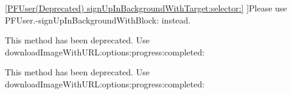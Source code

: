 \begin{DoxyRefList}
\hyperlink{category_p_f_user_07_deprecated_08_a02d96a7bd6d61e0a79fb020cacb9189f}{\mbox{[}P\+F\+User(Deprecated) sign\+Up\+In\+Background\+With\+Target\+:selector\+:\mbox{]}} ]Please use {\ttfamily P\+F\+User.-\/sign\+Up\+In\+Background\+With\+Block\+:} instead.  
\item[\label{deprecated__deprecated000055}%
\hypertarget{deprecated__deprecated000055}{}%
\hyperlink{category_s_d_web_image_manager_07_deprecated_08_a76672529aa9425cbdf50d79528040942}{\mbox{[}S\+D\+Web\+Image\+Manager(Deprecated) download\+With\+U\+R\+L\+:options\+:progress\+:completed\+:\mbox{]}} ]This method has been deprecated. Use {\ttfamily download\+Image\+With\+U\+R\+L\+:options\+:progress\+:completed\+:}  
\item[\label{deprecated__deprecated000055}%
\hypertarget{deprecated__deprecated000055}{}%
\hyperlink{category_s_d_web_image_manager_07_deprecated_08_a76672529aa9425cbdf50d79528040942}{\mbox{[}S\+D\+Web\+Image\+Manager(Deprecated) download\+With\+U\+R\+L\+:options\+:progress\+:completed\+:\mbox{]}} ]This method has been deprecated. Use {\ttfamily download\+Image\+With\+U\+R\+L\+:options\+:progress\+:completed\+:} 
\end{DoxyRefList}